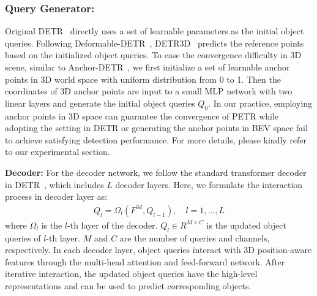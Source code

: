 \documentclass[runningheads]{llncs}
\begin{document}
\subsubsection{Query Generator:}
Original DETR~\cite{carion2020detr} directly uses a set of learnable parameters as the initial object queries. Following Deformable-DETR~\cite{zhu2020deformable}, DETR3D~\cite{wang2022detr3d} predicts the reference points based on the initialized object queries. To ease the convergence difficulty in 3D scene, similar to Anchor-DETR~\cite{wang2021anchor}, we first initialize a set of learnable anchor points in 3D world space with uniform distribution from 0 to 1. Then the coordinates of 3D anchor points are input to a small MLP network with two linear layers and generate the initial object queries $Q_{0}$. In our practice, employing anchor points in 3D space can guarantee the convergence of PETR while adopting the setting in DETR or generating the anchor points in BEV space fail to achieve satisfying detection performance. For more details, please kindly refer to our experimental section.

\noindent \textbf{Decoder:}
For the decoder network, we follow the standard transformer decoder in DETR~\cite{carion2020detr}, which includes $L$ decoder layers. Here, we formulate the interaction process in decoder layer as:
\begin{equation}\label{eq4}
\begin{aligned}
Q_l = \Omega_l(F^{3d}, Q_{l-1}), \quad l=1, \dots, L
\end{aligned}
\end{equation}
where $\Omega_l$ is the $l$-th layer of the decoder. $Q_{l} \in R^{M\times C}$ is the updated object queries of $l$-th layer. $M$ and $C$ are the number of queries and channels, respectively. In each decoder layer, object queries interact with 3D position-aware features through the multi-head attention and feed-forward network. After iterative interaction, the updated object queries have the high-level representations and can be used to predict corresponding objects.
\end{document}
